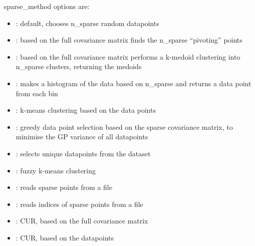 \documentclass[letterpaper,10pt,english]{sphinxmanual}
\begin{document}

\begin{fulllineitems}
\label{\detokenize{descriptors:gap.descriptors.sparse_method}}
sparse\_method options are:
\begin{itemize}
\item {} 
: default, chooses n\_sparse random datapoints

\item {} 
: based on the full covariance matrix finds the n\_sparse “pivoting” points

\item {} 
: based on the full covariance matrix performs a k-medoid clustering into n\_sparse clusters, returning the medoids

\item {} 
: makes a histogram of the data based on n\_sparse and returns a data point from each bin

\item {} 
: k-means clustering based on the data points

\item {} 
: greedy data point selection based on the sparse covariance matrix, to minimise the GP variance of all datapoints

\item {} 
: selects unique datapoints from the dataset

\item {} 
: fuzzy k-means clustering

\item {} 
: reads sparse points from a file

\item {} 
: reads indices of sparse points from a file

\item {} 
: CUR, based on the full covariance matrix

\item {} 
: CUR, based on the datapoints

\end{itemize}

\end{fulllineitems}
\end{document}
